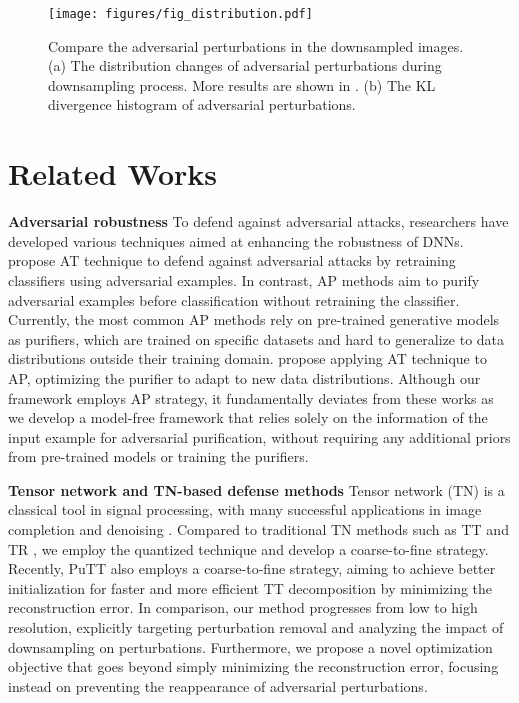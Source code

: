 \begin{figure*}[t]
\vskip 0.2in
    \centering
    \texttt{[image: figures/fig\_distribution.pdf]}
    \caption{Compare the adversarial perturbations in the downsampled images. (a) The distribution changes of adversarial perturbations during downsampling process. More results are shown in . (b) The KL divergence histogram of adversarial perturbations.}
    \label{fig:distribution}
    \vskip -0.1in
\end{figure*}

\section{Related Works}
\label{Related}
\textbf{Adversarial robustness} \quad To defend against adversarial attacks, researchers have developed various techniques aimed at enhancing the robustness of DNNs.
\citet{goodfellow2014explaining} propose AT technique to defend against adversarial attacks by retraining classifiers using adversarial examples. In contrast, AP methods \citep{shi2021online,srinivasan2021robustifying} aim to purify adversarial examples before classification without retraining the classifier. Currently, the most common AP methods \citep{nie2022diffusion,bai2024diffusion} rely on pre-trained generative models as purifiers, which are trained on specific datasets and hard to generalize to data distributions outside their training domain. \citet{lin2024adversarial} propose applying AT technique to AP, optimizing the purifier to adapt to new data distributions.
Although our framework employs AP strategy, it fundamentally deviates from these works as we develop a model-free framework that relies solely on the information of the input example for adversarial purification, without requiring any additional priors from pre-trained models or training the purifiers.


\textbf{Tensor network and TN-based defense methods} \quad Tensor network (TN) is a classical tool in signal processing, with many successful applications in image completion and denoising \citep{kolda2009tensor,cichocki2015tensor}.
Compared to traditional TN methods such as TT \citep{oseledets2011tensor} and TR \citep{zhao2016tensor}, we employ the quantized technique \citep{khoromskij2011d} and develop a coarse-to-fine strategy. Recently, PuTT \citep{loeschcke2024coarse} also employs a coarse-to-fine strategy, aiming to achieve better initialization for faster and more efficient TT decomposition by minimizing the reconstruction error.
In comparison, our method progresses from low to high resolution, explicitly targeting perturbation removal and analyzing the impact of downsampling on perturbations. Furthermore, we propose a novel optimization objective that goes beyond simply minimizing the reconstruction error, focusing instead on preventing the reappearance of adversarial perturbations.

